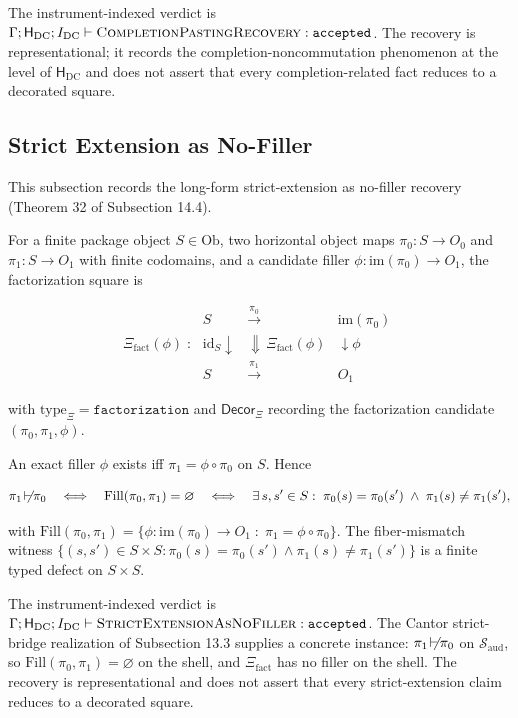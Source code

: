 \documentclass[11pt]{article}
\providecommand{\factor}{\mathrel{\!\vdash\!}}
\theoremstyle{definition}
\begin{document}
The instrument-indexed verdict is \(\Gamma;\mathsf H_{\mathrm{DC}};I_{\mathrm{DC}}\vdash\textsc{CompletionPastingRecovery}:\texttt{accepted}\). The recovery is representational; it records the completion-noncommutation phenomenon at the level of \(\mathsf H_{\mathrm{DC}}\) and does not assert that every completion-related fact reduces to a decorated square.

\subsection{Strict Extension as No-Filler}

This subsection records the long-form strict-extension as no-filler recovery (Theorem 32 of Subsection 14.4).

For a finite package object \(S\in\mathrm{Ob}\), two horizontal object maps \(\pi_{0}:S\to O_{0}\) and \(\pi_{1}:S\to O_{1}\) with finite codomains, and a candidate filler \(\phi:\mathrm{im}(\pi_{0})\to O_{1}\), the factorization square is

\[
\Xi_{\mathrm{fact}}(\phi)\;:\;
\begin{array}{ccc}
S & \xrightarrow{\pi_{0}} & \mathrm{im}(\pi_{0})\\
{\scriptstyle\mathrm{id}_{S}}\downarrow & \Downarrow\,\Xi_{\mathrm{fact}}(\phi) & \downarrow{\scriptstyle\phi}\\
S & \xrightarrow{\pi_{1}} & O_{1}
\end{array}
\]

with \(\mathrm{type}_{\Xi}=\texttt{factorization}\) and \(\mathsf{Decor}_{\Xi}\) recording the factorization candidate \((\pi_{0},\pi_{1},\phi)\).

An exact filler \(\phi\) exists iff \(\pi_{1}=\phi\circ\pi_{0}\) on \(S\). Hence

\[
\pi_{1}\not\factor\pi_{0}\quad\Longleftrightarrow\quad\mathrm{Fill}(\pi_{0},\pi_{1})=\varnothing\quad\Longleftrightarrow\quad\exists\,s,s'\in S:\;\pi_{0}(s)=\pi_{0}(s')\;\land\;\pi_{1}(s)\neq\pi_{1}(s'),
\]

with \(\mathrm{Fill}(\pi_{0},\pi_{1})=\{\phi:\mathrm{im}(\pi_{0})\to O_{1}\;:\;\pi_{1}=\phi\circ\pi_{0}\}\). The fiber-mismatch witness \(\{(s,s')\in S\times S:\pi_{0}(s)=\pi_{0}(s')\land\pi_{1}(s)\neq\pi_{1}(s')\}\) is a finite typed defect on \(S\times S\).

The instrument-indexed verdict is \(\Gamma;\mathsf H_{\mathrm{DC}};I_{\mathrm{DC}}\vdash\textsc{StrictExtensionAsNoFiller}:\texttt{accepted}\). The Cantor strict-bridge realization of Subsection 13.3 supplies a concrete instance: \(\pi_{1}\not\factor\pi_{0}\) on \(\mathcal S_{\mathrm{aud}}\), so \(\mathrm{Fill}(\pi_{0},\pi_{1})=\varnothing\) on the shell, and \(\Xi_{\mathrm{fact}}\) has no filler on the shell. The recovery is representational and does not assert that every strict-extension claim reduces to a decorated square.
\end{document}

